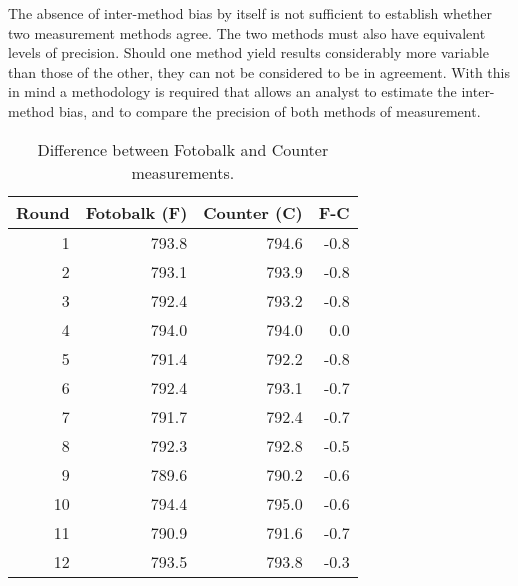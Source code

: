 \documentclass[12pt, a4paper]{report}
\theoremstyle{plain}
\theoremstyle{definition}
\theoremstyle{remark}
\begin{document}
	The absence of inter-method bias by itself is not sufficient to
	establish whether two measurement methods agree. The two methods
	must also have equivalent levels of precision. Should one method
	yield results considerably more variable than those of the other,
	they can not be considered to be in agreement. With this in mind a
	methodology is required that allows an analyst to estimate the
	inter-method bias, and to compare the precision of both methods of
	measurement.
	\newpage
	\begin{table}[h!]
		
		\begin{center}
			
			\begin{tabular}{rrrr}
				\hline
				Round& Fotobalk (F) & Counter (C) & F-C \\
				\hline
				1 & 793.8& 794.6 & -0.8 \\
				2 & 793.1 & 793.9 & -0.8 \\
				3 & 792.4 & 793.2 & -0.8 \\
				4 & 794.0 & 794.0 & 0.0 \\
				5 & 791.4 & 792.2 & -0.8 \\
				6 & 792.4 & 793.1 & -0.7 \\
				7 & 791.7 & 792.4 & -0.7 \\
				8 & 792.3 & 792.8 & -0.5 \\
				9 & 789.6 & 790.2 & -0.6 \\
				10 & 794.4 & 795.0 & -0.6 \\
				11 & 790.9 & 791.6 & -0.7 \\
				12 & 793.5 & 793.8 & -0.3 \\
				\hline
			\end{tabular}
			\caption{Difference between Fotobalk and Counter measurements.}
		\end{center}
	\end{table}
	

	

	

	
\end{document}
